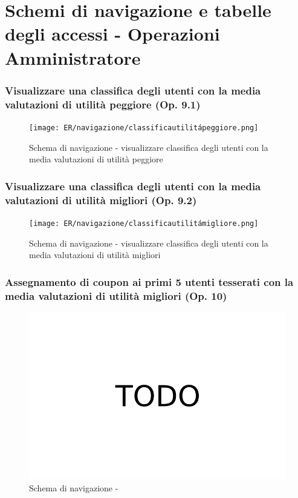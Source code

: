 \documentclass[a4paper,12pt]{report}
\begin{document}
	\section{Schemi di navigazione e tabelle degli accessi - Operazioni Amministratore}
	\subsubsection{Visualizzare una classifica degli utenti con la media valutazioni di utilità peggiore (Op. 9.1)}
	\begin{figure}[H]
		\centering
		\texttt{[image: ER/navigazione/classificautilitápeggiore.png]}
		\caption{Schema di navigazione - visualizzare classifica degli utenti con la media valutazioni di utilità peggiore}
	\end{figure}
	
	\subsubsection{Visualizzare una classifica degli utenti con la media valutazioni di utilità migliori (Op. 9.2)}
	\begin{figure}[H]
		\centering
		\texttt{[image: ER/navigazione/classificautilitámigliore.png]}
		\caption{Schema di navigazione - visualizzare classifica degli utenti con la media valutazioni di utilità migliori}
	\end{figure}
	
	\subsubsection{Assegnamento di coupon ai primi 5 utenti tesserati con la media valutazioni di utilità migliori (Op. 10)}
	\begin{figure}[H]
		\centering
		\includegraphics[width=450pt]{ER/navigazione/couponutentimigliori.png}
		\caption{Schema di navigazione - }
	\end{figure}
	
\end{document}
